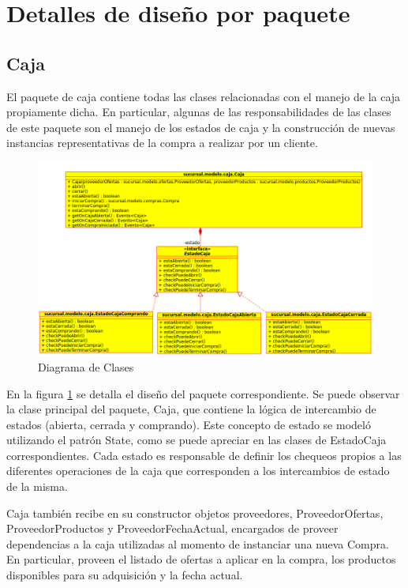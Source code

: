 \documentclass[a4paper,11pt]{article}
\begin{document}
\section{Detalles de diseño por paquete}

\subsection{Caja}

El paquete de caja contiene todas las clases relacionadas con el manejo de la
caja propiamente dicha. En particular, algunas de las responsabilidades de las
clases de este paquete son el manejo de los estados de caja y la construcción
de nuevas instancias representativas de la compra a realizar por un cliente.

\begin{figure}[!htp]
\begin{center}
\includegraphics[width=1\textwidth]{src/docs/caja.png}
\end{center}
\caption{Diagrama de Clases} \label{fig:caja}
\end{figure}

\FloatBarrier

En la figura \ref{fig:caja} se detalla el diseño del paquete correspondiente.
Se puede observar la clase principal del paquete, Caja, que contiene la lógica
de intercambio de estados (abierta, cerrada y comprando). Este concepto de
estado se modeló utilizando el patrón State, como se puede apreciar en las
clases de EstadoCaja correspondientes. Cada estado es responsable de definir
los chequeos propios a las diferentes operaciones de la caja que corresponden a
los intercambios de estado de la misma.

Caja también recibe en su constructor objetos proveedores, ProveedorOfertas,
ProveedorProductos y ProveedorFechaActual, encargados de proveer dependencias a
la caja utilizadas al momento de instanciar una nueva Compra. En particular,
proveen el listado de ofertas a aplicar en la compra, los productos disponibles
para su adquisición y la fecha actual.
\end{document}
